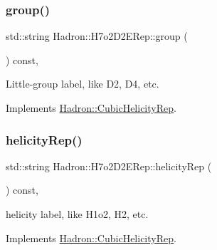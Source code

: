 \mbox{\label{structHadron_1_1H7o2D2ERep_a01d61c7d2d2ee0a909d40c5d43a90e09}} 
\subsubsection{\texorpdfstring{group()}{group()}\hspace{0.1cm}{\footnotesize\ttfamily [5/5]}}
{\footnotesize\ttfamily std\+::string Hadron\+::\+H7o2\+D2\+E\+Rep\+::group (\begin{DoxyParamCaption}{ }\end{DoxyParamCaption}) const\hspace{0.3cm}{\ttfamily [inline]}, {\ttfamily [virtual]}}

Little-\/group label, like D2, D4, etc. 

Implements \mbox{\hyperlink{structHadron_1_1CubicHelicityRep_a101a7d76cd8ccdad0f272db44b766113}{Hadron\+::\+Cubic\+Helicity\+Rep}}.

\mbox{\label{structHadron_1_1H7o2D2ERep_aa655a9ecae0dbff853de4c341c5da210}} 
\subsubsection{\texorpdfstring{helicityRep()}{helicityRep()}\hspace{0.1cm}{\footnotesize\ttfamily [1/3]}}
{\footnotesize\ttfamily std\+::string Hadron\+::\+H7o2\+D2\+E\+Rep\+::helicity\+Rep (\begin{DoxyParamCaption}{ }\end{DoxyParamCaption}) const\hspace{0.3cm}{\ttfamily [inline]}, {\ttfamily [virtual]}}

helicity label, like H1o2, H2, etc. 

Implements \mbox{\hyperlink{structHadron_1_1CubicHelicityRep_af1096946b7470edf0a55451cc662f231}{Hadron\+::\+Cubic\+Helicity\+Rep}}.

\mbox{\label{structHadron_1_1H7o2D2ERep_aa655a9ecae0dbff853de4c341c5da210}} 
